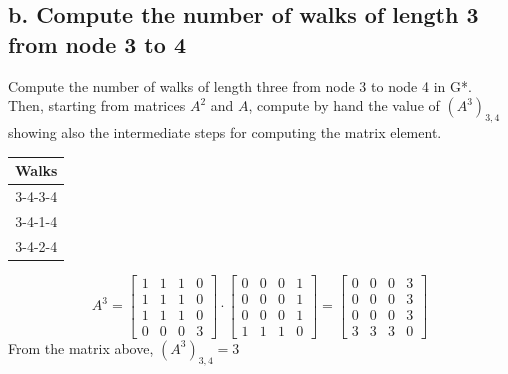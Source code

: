 \documentclass[a4paper,12pt]{article}
\begin{document}
\subsection*{b. Compute the number of walks of length 3 from node 3 to 4} Compute the number of walks of length three from node 3 to node 4 in G*. Then, starting from matrices $A^2$ and $A$, compute by hand the value of $(A^3)_{3,4}$ showing also the intermediate steps for computing the matrix element.
\begin{table}[h]
\centering
\begin{tabular}{c}
Walks\\
\hline
3-4-3-4\\
3-4-1-4\\
3-4-2-4
\end{tabular}
\end{table}

	\[A^3 = 
	\begin{bmatrix} 
		1&1&1&0\\
		1&1&1&0\\
		1&1&1&0\\
		0&0&0&3
	\end{bmatrix}
	\cdot
	\begin{bmatrix} 
		0&0&0&1\\
		0&0&0&1\\
		0&0&0&1\\
		1&1&1&0
	\end{bmatrix}	
	= 
	\begin{bmatrix} 
		0&0&0&3\\
		0&0&0&3\\
		0&0&0&3\\
		3&3&3&0
	\end{bmatrix}\]
From the matrix above, $(A^3)_{3,4} = 3$
\end{document}
